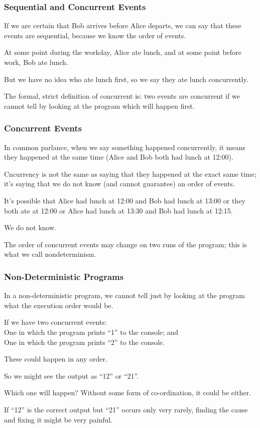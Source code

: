 \begin{frame}
\frametitle{Sequential and Concurrent Events}

If we are certain that Bob arrives before Alice departs, we can say that these events are \alert{sequential}, because we know the order of events. 

At some point during the workday, Alice ate lunch, and at some point before work, Bob ate lunch. 

But we have no idea who ate lunch first, so we say they ate lunch \alert{concurrently}. 

The formal, strict definition of concurrent is: two events are concurrent if we cannot tell by looking at the program which will happen first. 

\end{frame}

\begin{frame}
\frametitle{Concurrent Events}

In common parlance, when we say something happened concurrently, it means they happened at the same time (Alice and Bob both had lunch at 12:00). 

Cncurrency is not the same as saying that they happened at the exact same time; it's saying that we do not know (and cannot guarantee) an order of events. 

It's possible that Alice had lunch at 12:00 and Bob had lunch at 13:00 or they both ate at 12:00 or Alice had lunch at 13:30 and Bob had lunch at 12:15. 

We do not know. 

The order of concurrent events may change on two runs of the program; this is what we call \alert{nondeterminism}.

\end{frame}

\begin{frame}
\frametitle{Non-Deterministic Programs}

In a non-deterministic program, we cannot tell just by looking at the program what the execution order would be. 

If we have two concurrent events: \\
\quad One in which the program prints ``1'' to the console; and\\
\quad One in which the program prints ``2'' to the console.

These could happen in any order. 

So we might see the output as ``12'' or ``21''. 

Which one will happen? Without some form of co-ordination, it could be either. 

If ``12'' is the correct output but ``21'' occurs only very rarely, finding the cause and fixing it might be very painful.


\end{frame}


